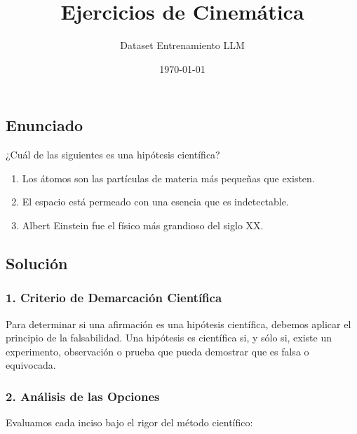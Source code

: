 \documentclass[12pt, a4paper]{article}
\title{Ejercicios de Cinemática}
\author{Dataset Entrenamiento LLM}
\date{\today}
\begin{document}
\subsection*{Enunciado}
¿Cuál de las siguientes es una hipótesis científica?
\begin{enumerate}[label=\alph*)]
    \item Los átomos son las partículas de materia más pequeñas que existen.
    \item El espacio está permeado con una esencia que es indetectable.
    \item Albert Einstein fue el físico más grandioso del siglo XX.
\end{enumerate}

\subsection*{Solución}

\subsubsection*{1. Criterio de Demarcación Científica}
Para determinar si una afirmación es una hipótesis científica, debemos aplicar el principio de la falsabilidad. Una hipótesis es científica si, y sólo si, existe un experimento, observación o prueba que pueda demostrar que es falsa o equivocada. 

\subsubsection*{2. Análisis de las Opciones}
Evaluamos cada inciso bajo el rigor del método científico:
\end{document}
